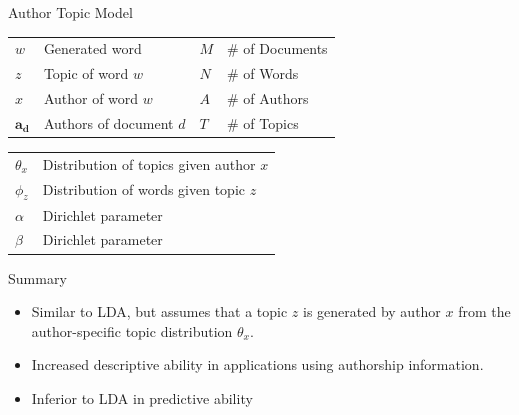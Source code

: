 \documentclass[10pt, svgnames]{beamer}
\begin{document}
\begin{frame}{Author Topic Model \cite{atm}}
	\begin{minipage}{0.5\linewidth} 
		\begin{center}
			
		\end{center}
		\tiny{
		\begin{tabular}{llll}
			$w$ & Generated word    & $M$ & \# of Documents \\
			$z$ & Topic of word $w$ & $N$ & \# of Words\\
			$x$ & Author of word $w$ & $A$ & \# of Authors   \\
			$\mathbf{a_d}$ & Authors of document $d$ & $T$ & \# of Topics
		\end{tabular}
		\begin{tabular}{ll}
			$\theta_x$ & Distribution of topics given author $x$ \\
			$\phi_z$   & Distribution of words given topic $z$ \\
			$\alpha$   & Dirichlet parameter \\
			$\beta$    & Dirichlet parameter
		\end{tabular}
		}
	\end{minipage}
	\begin{minipage}{0.45\linewidth}
		  \begin{block}{Summary}
			  \begin{itemize}
					\item Similar to LDA, but assumes that a topic $z$ is
						generated by author $x$ from the author-specific topic
						distribution $\theta_x$.
					\item Increased descriptive ability in applications using authorship
				information.
					\item Inferior to LDA in predictive ability
			  \end{itemize}
		  \end{block}
	  \end{minipage}
\end{frame}
\end{document}
